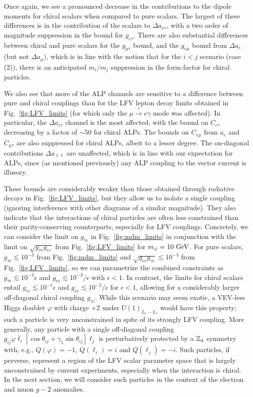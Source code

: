 {Once again, we see a pronounced decrease in the contributions to the dipole moments for chiral scalars when compared to pure scalars. The largest of these differences is in the contribution of the scalars to $\Delta a_{e\tau}$, with a two order of magnitude suppression in the bound for $g_{e\tau}$. There are also substantial differences between chiral and pure scalars for the $g_{\mu \tau}$ bound, and the $g_{e\mu}$ bound from $\Delta a_{e}$ (but not $\Delta a_\mu$), which is in line with the notion that for the $i < j$ scenario (case (2)), there is an anticipated $m_i/m_j$ suppression in the form-factor for chiral particles.

We also see that more of the ALP channels are sensitive to a difference between pure and chiral couplings than for the LFV lepton decay limits obtained in Fig.~\ref{fig:LFV_limits} (for which only the $\mu \stackrel{\tau}{\longrightarrow}e\gamma$ mode was affected). In particular, the $\Delta a_{e\tau}$ channel is the most affected, with the bound on $C_{e\tau}$ decreasing by a factor of $\sim 50$ for chiral ALPs. The bounds on $C_{e\mu}$ from $a_e$ and $C_{\mu\tau}$ are also suppressed for chiral ALPs, albeit to a lesser degree. The on-diagonal contributions $\Delta a_{\ell\ell}$ are unaffected, which is in line with our expectation for ALPs, since (as mentioned previously) any ALP coupling to the vector current is illusory.

These bounds are considerably weaker than those obtained through radiative decays in Fig.~\ref{fig:LFV_limits}, but they allow us to isolate a single coupling (ignoring interference with other diagrams of a similar magnitude). They also indicate that the interactions of chiral particles are often less constrained than their parity-conserving counterparts, especially for LFV couplings. Concretely, we can consider the limit on $g_{\tau e}$ in Fig.~\ref{fig:mdm_limits} in conjunction with the limit on $\sqrt{g_{\tau e}g_{ee}}$ from Fig.~\ref{fig:LFV_limits} for $m_\varphi = 10~{\rm GeV}$. For pure scalars, $g_{\tau e} \lesssim 10^{-3}$ from Fig.~\ref{fig:mdm_limits} and $\sqrt{g_{ee}g_{\tau e}} \lesssim 10^{-3}$ from Fig.~\ref{fig:LFV_limits}, so we can parametrize the combined constraints as $g_{\tau e} \lesssim 10^{-3}\epsilon$ and $g_{ee} \lesssim 10^{-3}/\epsilon$ with $\epsilon < 1$. In contrast, the limits for chiral scalars entail $g_{\tau e}\lesssim 10^{-1}\epsilon$ and $g_{ee}\lesssim 10^{-5}/\epsilon$ for $\epsilon < 1$, allowing for a considerably larger off-diagonal chiral coupling $g_{\tau e}$. While this scenario may seem exotic, a VEV-less Higgs doublet $\varphi$ with charge $+2$ under $U(1)_{L_e - L_\tau}$ would have this property; such a particle is very unconstrained in spite of its strongly LFV coupling. More generally, any particle with a single off-diagonal coupling $g_{ij}\varphi \bar{\ell}_i[\cos{\theta_{ij}}+\gamma_5 \sin{\theta_{ij}}]\ell_j$ is perturbatively protected by a ${\Bbb Z}_4$ symmetry with, e.g., $Q(\varphi) = -1$, $Q(\ell_i) = i$ and $Q(\ell_j) = -i$. Such particles, if perverse, represent a region of the LFV scalar parameter space that is largely unconstrained by current experiments, especially when the interaction is chiral. In the next section, we will consider such particles in the context of the electron and muon $g-2$ anomalies.

}
